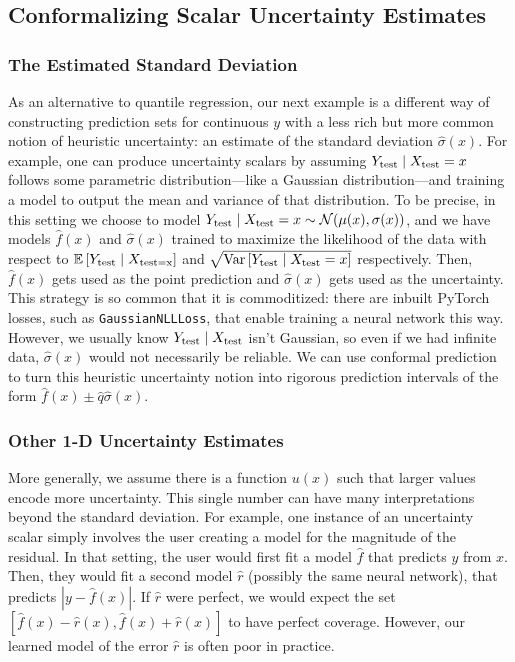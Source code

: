 \documentclass[10pt]{article}
\def\E{\mathbb{E}}
\begin{document}
\subsection{Conformalizing Scalar Uncertainty Estimates}
\label{subsec:uncertainty-scalar}
\subsubsection{The Estimated Standard Deviation}
As an alternative to quantile regression, our next example is a different way of constructing prediction sets for continuous $y$ with a less rich but more common notion of heuristic uncertainty: an estimate of the standard deviation $\hat{\sigma}(x)$.  For example, one can produce uncertainty scalars by assuming $Y_{\rm test}\mid X_{\rm test} = x$ follows some parametric distribution---like a Gaussian distribution---and training a model to output the mean and variance of that distribution.
To be precise, in this setting we choose to model $Y_{\rm test}\mid X_{\rm test} = x \sim \mathcal{N}(\mu(x),\sigma(x))$, and we have models $\hat{f}(x)$ and $\hat{\sigma}(x)$ trained to maximize the likelihood of the data with respect to $\E\left[Y_{\rm test}\mid X_{\rm test = x}\right]$ and $\sqrt{\textrm{Var} \left[ Y_{\rm test}\mid X_{\rm test} = x \right]}$ respectively.
Then, $\hat{f}(x)$ gets used as the point prediction and $\hat{\sigma}(x)$ gets used as the uncertainty.
This strategy is so common that it is commoditized: there are inbuilt PyTorch losses, such as \texttt{GaussianNLLLoss}, that enable training a neural network this way.
However, we usually know $Y_{\rm test}\mid X_{\rm test}$ isn't Gaussian, so even if we had infinite data, $\hat{\sigma}(x)$ would not necessarily be reliable. 
We can use conformal prediction to turn this heuristic uncertainty notion into rigorous prediction intervals of the form $\hat{f}(x) \pm \hat{q}\hat{\sigma}(x)$.


\subsubsection{Other 1-D Uncertainty Estimates}
More generally, we assume there is a function $u(x)$ such that larger values encode more uncertainty.
This single number can have many interpretations beyond the standard deviation.
For example, one instance of an uncertainty scalar simply involves the user creating a model for the magnitude of the residual.
In that setting, the user would first fit a model $\hat{f}$ that predicts $y$ from $x$.
Then, they would fit a second model $\hat{r}$ (possibly the same neural network), that predicts $\left|y-\hat{f}(x)\right|$.
If $\hat{r}$ were perfect, we would expect the set $\left[\hat{f}(x)-\hat{r}(x), \hat{f}(x)+\hat{r}(x)\right]$ to have perfect coverage.
However, our learned model of the error $\hat{r}$ is often poor in practice.
\end{document}

